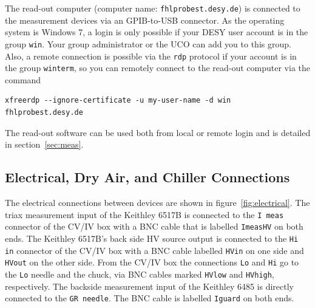 \documentclass[a4paper]{article}
\begin{document}
The read-out computer (computer name: {\tt fhlprobest.desy.de}) is connected to the measurement devices via an GPIB-to-USB connector.
As the operating system is Windows 7, a login is only possible if your DESY user account is in the group {\tt win}.
Your group administrator or the UCO can add you to this group.
Also, a remote connection is possible via the {\tt rdp} protocol if your account is in the group {\tt winterm}, so you can remotely connect to the read-out computer via the command

\medskip
\begin{lstlisting}
xfreerdp --ignore-certificate -u my-user-name -d win fhlprobest.desy.de
\end{lstlisting}
\medskip

The read-out software can be used both from local or remote login and is detailed in section~\ref{sec:meas}.\\

\subsection{Electrical, Dry Air, and Chiller Connections}
\label{sec:connections}

The electrical connections between devices are shown in figure~\ref{fig:electrical}.
The triax measurement input of the Keithley 6517B is connected to the {\tt I meas} connector of the CV/IV box with a BNC cable that is labelled {\tt ImeasHV} on both ends.
The Keithley 6517B's back side HV source output is connected to the {\tt Hi in} connector of the CV/IV box with a BNC cable labelled {\tt HVin} on one side and {\tt HVout} on the other side.
From the CV/IV box the connections {\tt Lo} and {\tt Hi} go to the {\tt Lo} needle and the chuck, via BNC cables marked {\tt HVlow} and {\tt HVhigh}, respectively.
The backside measurement input of the Keithley 6485 is directly connected to the {\tt GR needle}.
The BNC cable is labelled {\tt Iguard} on both ends.\\
\end{document}
